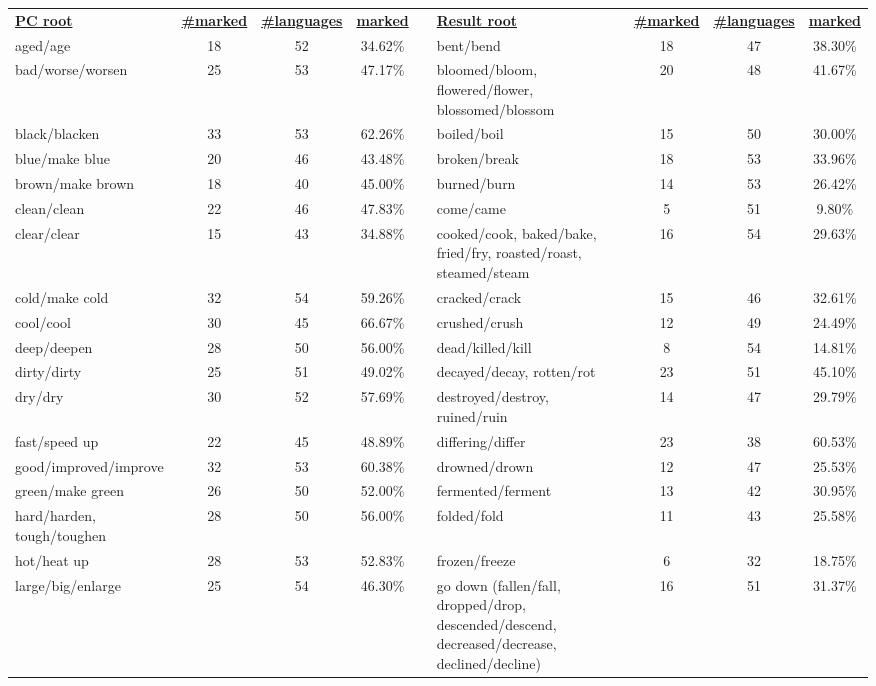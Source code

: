\begin{tabular}{p{3cm}ccccp{3cm}ccc}
\underline{\textbf{PC root}} & \underline{\textbf{\#marked}} & \underline{\textbf{\#languages}} & \underline{\textbf{marked}} & & \underline{\textbf{Result root}} & \underline{\textbf{\#marked}} & \underline{\textbf{\#languages}} & \underline{\textbf{marked}} \\
aged/age & 18 & 52 & 34.62\% & & bent/bend & 18 & 47 & 38.30\% \\
bad/worse/worsen & 25 & 53 & 47.17\% & & bloomed/bloom, flowered/flower, blossomed/blossom & 20 & 48 & 41.67\% \\
black/blacken & 33 & 53 & 62.26\% & & boiled/boil & 15 & 50 & 30.00\% \\
blue/make blue & 20 & 46 & 43.48\% & & broken/break & 18 & 53 & 33.96\% \\
brown/make brown & 18 & 40 & 45.00\% & & burned/burn & 14 & 53 & 26.42\% \\
clean/clean & 22 & 46 & 47.83\% & & come/came & 5 & 51 & 9.80\% \\
clear/clear & 15 & 43 & 34.88\% & & cooked/cook, baked/bake, fried/fry, roasted/roast, steamed/steam & 16 & 54 & 29.63\% \\
cold/make cold & 32 & 54 & 59.26\% & & cracked/crack & 15 & 46 & 32.61\% \\
cool/cool & 30 & 45 & 66.67\% & & crushed/crush & 12 & 49 & 24.49\% \\
deep/deepen & 28 & 50 & 56.00\% & & dead/killed/kill & 8 & 54 & 14.81\% \\
dirty/dirty & 25 & 51 & 49.02\% & & decayed/decay, rotten/rot & 23 & 51 & 45.10\% \\
dry/dry & 30 & 52 & 57.69\% & & destroyed/destroy, ruined/ruin & 14 & 47 & 29.79\% \\
fast/speed up & 22 & 45 & 48.89\% & & differing/differ & 23 & 38 & 60.53\% \\
good/improved/improve & 32 & 53 & 60.38\% & & drowned/drown & 12 & 47 & 25.53\% \\
green/make green & 26 & 50 & 52.00\% & & fermented/ferment & 13 & 42 & 30.95\% \\
hard/harden, tough/toughen & 28 & 50 & 56.00\% & & folded/fold & 11 & 43 & 25.58\% \\
hot/heat up & 28 & 53 & 52.83\% & & frozen/freeze & 6 & 32 & 18.75\% \\
large/big/enlarge & 25 & 54 & 46.30\% & & go down (fallen/fall, dropped/drop, descended/descend, decreased/decrease, declined/decline) & 16 & 51 & 31.37\% \\

\end{tabular}
